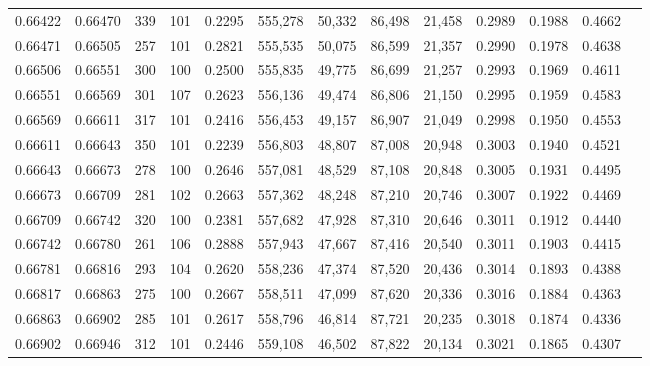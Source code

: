 \begin{tabular}{rrrrrrrrrrrrr}
0.66422 & 0.66470 &   339 & 101 &                                     0.2295 & 555,278 &  50,332 &  86,498 &  21,458 & 0.2989 & 0.1988 & 0.4662 \\
0.66471 & 0.66505 &   257 & 101 &                                     0.2821 & 555,535 &  50,075 &  86,599 &  21,357 & 0.2990 & 0.1978 & 0.4638 \\
0.66506 & 0.66551 &   300 & 100 &                                     0.2500 & 555,835 &  49,775 &  86,699 &  21,257 & 0.2993 & 0.1969 & 0.4611 \\
0.66551 & 0.66569 &   301 & 107 &                                     0.2623 & 556,136 &  49,474 &  86,806 &  21,150 & 0.2995 & 0.1959 & 0.4583 \\
0.66569 & 0.66611 &   317 & 101 &                                     0.2416 & 556,453 &  49,157 &  86,907 &  21,049 & 0.2998 & 0.1950 & 0.4553 \\
0.66611 & 0.66643 &   350 & 101 &                                     0.2239 & 556,803 &  48,807 &  87,008 &  20,948 & 0.3003 & 0.1940 & 0.4521 \\
0.66643 & 0.66673 &   278 & 100 &                                     0.2646 & 557,081 &  48,529 &  87,108 &  20,848 & 0.3005 & 0.1931 & 0.4495 \\
0.66673 & 0.66709 &   281 & 102 &                                     0.2663 & 557,362 &  48,248 &  87,210 &  20,746 & 0.3007 & 0.1922 & 0.4469 \\
0.66709 & 0.66742 &   320 & 100 &                                     0.2381 & 557,682 &  47,928 &  87,310 &  20,646 & 0.3011 & 0.1912 & 0.4440 \\
0.66742 & 0.66780 &   261 & 106 &                                     0.2888 & 557,943 &  47,667 &  87,416 &  20,540 & 0.3011 & 0.1903 & 0.4415 \\
0.66781 & 0.66816 &   293 & 104 &                                     0.2620 & 558,236 &  47,374 &  87,520 &  20,436 & 0.3014 & 0.1893 & 0.4388 \\
0.66817 & 0.66863 &   275 & 100 &                                     0.2667 & 558,511 &  47,099 &  87,620 &  20,336 & 0.3016 & 0.1884 & 0.4363 \\
0.66863 & 0.66902 &   285 & 101 &                                     0.2617 & 558,796 &  46,814 &  87,721 &  20,235 & 0.3018 & 0.1874 & 0.4336 \\
0.66902 & 0.66946 &   312 & 101 &                                     0.2446 & 559,108 &  46,502 &  87,822 &  20,134 & 0.3021 & 0.1865 & 0.4307 \\

\end{tabular}
